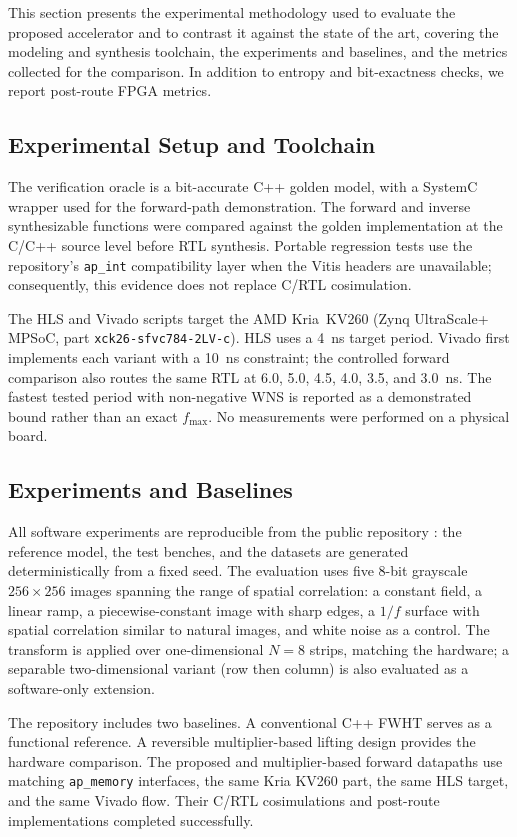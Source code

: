 \documentclass[conference]{IEEEtran}
\begin{document}
This section presents the experimental methodology used to evaluate the proposed
accelerator and to contrast it against the state of the art, covering the modeling
and synthesis toolchain, the experiments and baselines, and the metrics collected
for the comparison. In addition to entropy and bit-exactness checks, we report 
post-route FPGA metrics.

\subsection{Experimental Setup and Toolchain}
The verification oracle is a bit-accurate C++ golden model, with a SystemC wrapper used for the forward-path demonstration. The forward and inverse synthesizable functions were compared against the golden implementation at the C/C++ source level before RTL synthesis. Portable regression tests use the repository's \texttt{ap\_int} compatibility layer when the Vitis headers are unavailable; consequently, this evidence does not replace C/RTL cosimulation.

The HLS and Vivado scripts target the AMD Kria~KV260 (Zynq UltraScale+ MPSoC, part \texttt{xck26-sfvc784-2LV-c}). HLS uses a 4~ns target period. Vivado first implements each variant with a 10~ns constraint; the controlled forward comparison also routes the same RTL at 6.0, 5.0, 4.5, 4.0, 3.5, and 3.0~ns. The fastest tested period with non-negative WNS is reported as a demonstrated bound rather than an exact $f_{\max}$. No measurements were performed on a physical board.

\subsection{Experiments and Baselines}
All software experiments are reproducible from the public repository \cite{repo_grupo5}: 
the reference model, the test benches, and the datasets are generated 
deterministically from a fixed seed. The evaluation uses five 8-bit grayscale 
$256\times256$ images spanning the range of spatial correlation: a constant field, 
a linear ramp, a piecewise-constant image with sharp edges, a $1/f$ surface with 
spatial correlation similar to natural images, and white noise as a control. The 
transform is applied over one-dimensional $N=8$ strips, matching the hardware; 
a separable two-dimensional variant (row then column) is also evaluated as a 
software-only extension.

The repository includes two baselines. A conventional C++ FWHT serves as a functional reference. A reversible multiplier-based lifting design provides the hardware comparison. The proposed and multiplier-based forward datapaths use matching \texttt{ap\_memory} interfaces, the same Kria KV260 part, the same HLS target, and the same Vivado flow. Their C/RTL cosimulations and post-route implementations completed successfully.
\end{document}
